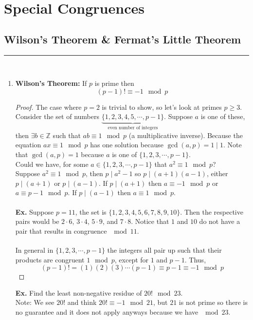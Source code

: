 \documentclass[class=article, crop=false]{standalone}
\def\integers{{\mathbb Z}}
\begin{document}
\setcounter{section}{5}
\section{Special Congruences}

\subsection{Wilson's Theorem \& Fermat's Little Theorem}
\rule{\textwidth}{1pt}\\
\begin{enumerate}[1.]
	\item \textbf{Wilson's Theorem:}
	If $p$ is prime then $$(p-1)!\equiv -1\mod p$$
	\begin{proof}
		The case where $p=2$ is trivial to show, so let's look at primes $p\geq 3$.
		Consider the set of numbers $\underbrace{\{1,2,3,4,5,\cdots,p-1\}}_{\text{even number of integers}}$.
		Suppose $a$ is one of these, then $\exists b\in\integers$ such that $ab\equiv 1\mod p$ (a multiplicative inverse).
		Because the equation $ax\equiv 1\mod p$ has one solution because $\gcd(a,p)=1\mid1$.
		Note that $\gcd(a,p)=1$ because $a$ is one of $\{1,2,3,\cdots,p-1\}$.\\
		Could we have, for some $a\in\{1,2,3,\cdots, p-1\}$ that $a^2\equiv 1\mod p$?\\
		Suppose $a^2\equiv 1\mod p$, then $p\mid a^2-1$ so $p\mid (a+1)(a-1)$, either
		$p\mid (a+1)$ or $p\mid (a-1)$.
		If $p\mid (a+1)$ then $a\equiv -1\mod p$ or $a\equiv p-1\mod p$. If $p\mid(a-1)$
		then $a\equiv 1\mod p$.\\\\
		\textbf{Ex.} Suppose $p=11$, the set is $\{1,2,3,4,5,6,7,8,9,10\}$. Then the respective
		pairs would be $2\cdot6$, $3\cdot4$, $5\cdot9$, and $7\cdot8$. Notice that $1$ and $10$
		do not have a pair that results in congruence $\mod 11$.\\\\
		In general in $\{1,2,3,\cdots,p-1\}$ the integers all pair up such that their products
		are congruent $1\mod p$, except for $1$ and $p-1$. Thus,
		$$(p-1)!=(1)(2)(3)\cdots(p-1)\equiv p-1\equiv -1\mod p$$
	\end{proof}
	\noindent\textbf{Ex.} Find the least non-negative residue of $20!\mod 23$.\\
	Note: We see $20!$ and think $20!\equiv -1\mod 21$, but $21$ is not prime so there is
	no guarantee and it does not apply anyways because we have $\mod 23$.\\

\end{enumerate}
\end{document}
